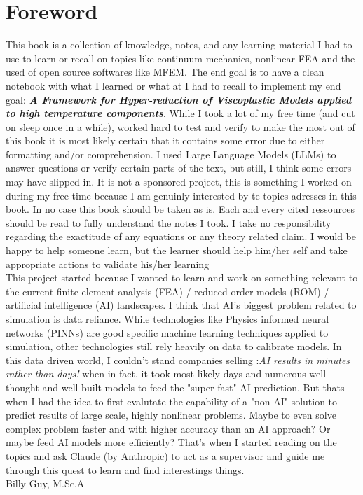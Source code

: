 \chapter{Foreword}
This book is a collection of knowledge, notes, and any learning material I had to use to learn or recall on topics like continuum mechanics, nonlinear FEA and the used of open source softwares like MFEM. The end goal is to have a clean notebook with what I learned or what at I had to recall to implement my end goal: \textbf{\textit{A Framework for Hyper-reduction of Viscoplastic Models applied to high temperature components}}. While I took a lot of my free time (and cut on sleep once in a while), worked hard to test and verify to make the most out of this book it is most likely certain that it contains some error due to either formatting and/or comprehension. I used Large Language Models (LLMs) to answer questions or verify certain parts of the text, but still, I think some errors may have slipped in. It is not a sponsored project, this is something I worked on during my free time because I am genuinly interested by te topics adresses in this book. In no case this book should be taken as is. Each and every cited ressources should be read to fully understand the notes I took. I take no responsibility regarding the exactitude of any equations or any theory related claim. I would be happy to help someone learn, but the learner should help him/her self and take appropriate actions to validate his/her learning\\

This project started because I wanted to learn and work on something relevant to the current finite element analysis (FEA) / reduced order models (ROM) / artificial intelligence (AI) landscapes. I think that AI's biggest problem related to simulation is data reliance. While technologies like Physics informed neural networks (PINNs) are good specific machine learning techniques applied to simulation, other technologies still rely heavily on data to calibrate models. In this data driven world, I couldn't stand companies selling :\textit{AI results in minutes rather than days!} when in fact, it took most likely days and numerous well thought and well built models to feed the "super fast" AI prediction. But thats when I had the idea to first evalutate the capability of a "non AI" solution to predict results of large scale, highly nonlinear problems. Maybe to even solve complex problem faster and with higher accuracy than an AI approach? Or maybe feed AI models more efficiently?  That's when I started reading on the topics and ask Claude (by Anthropic) to act as a supervisor and guide me through this quest to learn and find interestings things.
\\

\noindent
Billy Guy, M.Sc.A